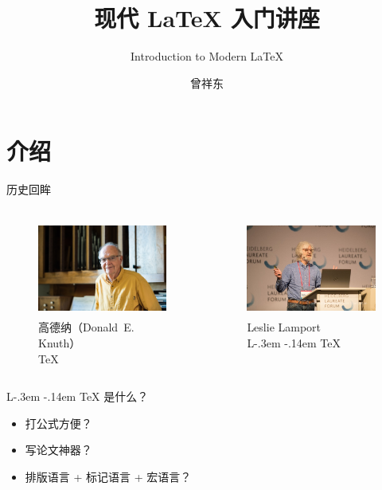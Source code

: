 \documentclass[fontset=none]{ctexbeamer}
\title{现代 \LaTeX{} 入门讲座}
\subtitle{Introduction to Modern \LaTeX{}}
\author{曾祥东}
\institute{复旦大学\quad 物理系}
\date{\zhdate{2018/12/6}}
\DeclareRobustCommand{\LaTeX}{%
  L\kern-.3em%
  \raisebox{.2em}{\textsc{a}}\kern-.14em%
  \TeX}
\begin{document}
\maketitle

\section{介绍}

\begin{frame}{历史回眸}
\begin{columns}
\begin{column}{0.45\textwidth}
  \begin{figure}
    \centering
    \includegraphics[height=3.2cm]{figures/Knuth-vivian20181019E.jpg}
    \caption{高德纳（Donald~E. Knuth）\footnotemark \\ \TeX}
  \end{figure}
\end{column}
\begin{column}{0.45\textwidth}
  \begin{figure}
    \centering
    \includegraphics[height=3.2cm]{figures/lamport-2018.jpg}
    \caption{Leslie Lamport~\footnotemark \\ \LaTeX}
  \end{figure}
\end{column}
\end{columns}
\end{frame}

\begin{frame}{\LaTeX{} 是什么？}
\begin{itemize}
  \item 打公式方便？
  \item 写论文神器？
  \item 排版语言 + 标记语言 + 宏语言？
\end{itemize}
\end{frame}
\end{document}
